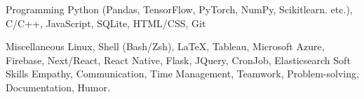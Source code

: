 

\begin{cvskills}

  \cvskill
    {Programming} %
    {Python (Pandas, TensorFlow, PyTorch, NumPy, Scikit\-learn. etc.), C/C++, JavaScript, SQLite, HTML/CSS, Git} %

  \cvskill
    {Miscellaneous} %
    {Linux, Shell (Bash/Zsh), \LaTeX, Tableau, Microsoft Azure, Firebase, Next/React, React Native, Flask, JQuery, CronJob, Elasticsearch} %
  \cvskill
    {Soft Skills} %
    {Empathy, Communication, Time Management, Teamwork, Problem-solving, Documentation, Humor.} %
    

\end{cvskills}
